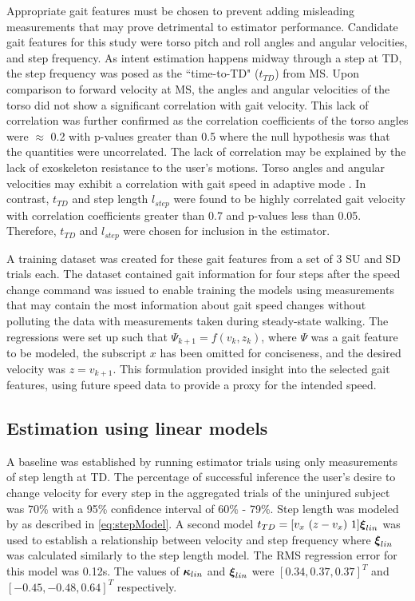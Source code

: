 Appropriate gait features must be chosen to prevent adding misleading measurements that may prove detrimental to estimator performance. Candidate gait features for this study were torso pitch and roll angles and angular velocities, and step frequency. As intent estimation happens midway through a step at TD, the step frequency was posed as the ``time-to-TD" ($ t_{TD} $) from MS. Upon comparison to forward velocity at MS, the angles and angular velocities of the torso did not show a significant correlation with gait velocity. This lack of correlation was further confirmed as the correlation coefficients of the torso angles were $ \approx $ 0.2 with p-values greater than 0.5 where the null hypothesis was that the quantities were uncorrelated. The lack of correlation may be explained by the lack of exoskeleton resistance to the user's motions. Torso angles and angular velocities may exhibit a correlation with gait speed in adaptive mode \cite{suzuki2007intention}. In contrast, $ t_{TD} $ and step length $ l_{step} $ were found to be highly correlated gait velocity with correlation coefficients greater than 0.7 and p-values less than 0.05. Therefore, $ t_{TD} $ and $ l_{step} $ were chosen for inclusion in the estimator. 

A training dataset was created for these gait features from a set of 3 SU and SD trials each. The dataset contained gait information for four steps after the speed change command was issued to enable training the models using measurements that may contain the most information about gait speed changes without polluting the data with measurements taken during steady-state walking. The regressions were set up such that $ \Psi_{k+1} = f(v_k,z_k) $, where $ \Psi $ was a gait feature to be modeled, the subscript $ x $ has been omitted for conciseness, and the desired velocity was $ z = v_{k+1} $. This formulation provided insight into the selected gait features, using future speed data to provide a proxy for the intended speed.

\subsection{Estimation using linear models}

A baseline was established by running estimator trials using only measurements of step length at TD. The percentage of successful inference the user's desire to change velocity for every step in the aggregated trials of the uninjured subject was 70\% with a 95\% confidence interval of 60\% - 79\%. Step length was modeled by as described in \eqref{eq:stepModel}. A second model $t_{TD} =  [v_x\ (z - v_x)\ 1] \boldsymbol{\xi}_{lin}$ was used to establish a relationship between velocity and step frequency where $ \boldsymbol{\xi}_{lin} $ was calculated similarly to the step length model. The RMS regression error for this model was 0.12s. The values of $ \boldsymbol{\kappa}_{lin} $ and $ \boldsymbol{\xi}_{lin} $ were $[0.34 ,0.37 ,0.37]^T$ and $ [-0.45 ,-0.48 ,0.64]^T $ respectively. 

